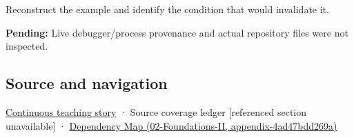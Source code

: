 Reconstruct the example and identify the condition that would invalidate it.

\textbf{Pending:} Live debugger/process provenance and actual repository files were not inspected.

\subsection{Source and navigation}\label{appendix-230b59c0676b-source-and-navigation}

\hyperref[01-foundations-i-ch002-bytes-become-a-durable-agreement]{Continuous teaching story} · {Source coverage ledger {[}referenced section unavailable{]}} · \href{../02-Foundations-II/main.pdf\#nameddest=appendix-4ad47bdd269a}{Dependency Map (02-Foundations-II, appendix-4ad47bdd269a)}
